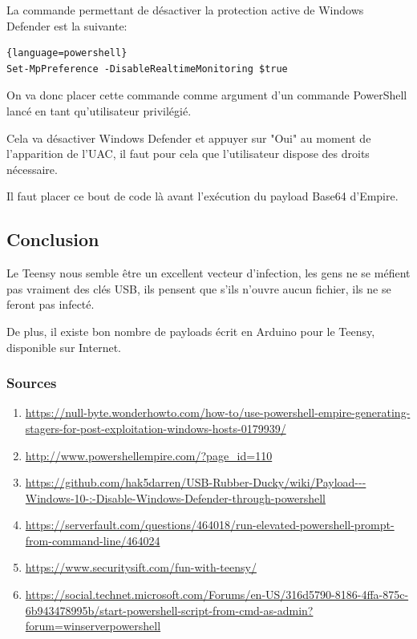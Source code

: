 La commande permettant de désactiver la protection active de Windows Defender est la suivante: 

\begin{lstlisting}{language=powershell}
Set-MpPreference -DisableRealtimeMonitoring $true
\end{lstlisting}

On va donc placer cette commande comme argument d'un commande PowerShell lancé en tant qu'utilisateur privilégié.

Cela va désactiver Windows Defender et appuyer sur "Oui" au moment de l'apparition de l'UAC, il faut pour cela que l'utilisateur dispose des droits nécessaire.

Il faut placer ce bout de code là avant l'exécution du payload Base64 d'Empire.

\subsection{Conclusion}
Le Teensy nous semble être un excellent vecteur d'infection, les gens ne se méfient pas vraiment
des clés USB, ils pensent que s'ils n'ouvre aucun fichier, ils ne se feront pas infecté.

De plus, il existe bon nombre de payloads écrit en Arduino pour le Teensy, disponible sur Internet.

\subsubsection{Sources}
\begin{enumerate}
    \item \url{https://null-byte.wonderhowto.com/how-to/use-powershell-empire-generating-stagers-for-post-exploitation-windows-hosts-0179939/}
    \item \url{http://www.powershellempire.com/?page_id=110}
    \item \url{https://github.com/hak5darren/USB-Rubber-Ducky/wiki/Payload---Windows-10-:-Disable-Windows-Defender-through-powershell}
    \item \url{https://serverfault.com/questions/464018/run-elevated-powershell-prompt-from-command-line/464024}
    \item \url{https://www.securitysift.com/fun-with-teensy/}
    \item \url{https://social.technet.microsoft.com/Forums/en-US/316d5790-8186-4ffa-875c-6b943478995b/start-powershell-script-from-cmd-as-admin?forum=winserverpowershell}
\end{enumerate}


